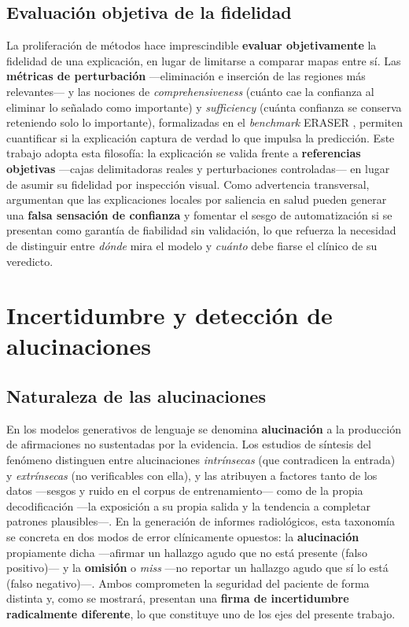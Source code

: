 \subsection{Evaluación objetiva de la fidelidad}
La proliferación de métodos hace imprescindible \textbf{evaluar objetivamente} la fidelidad de una
explicación, en lugar de limitarse a comparar mapas entre sí. Las \textbf{métricas de perturbación}
—eliminación e inserción de las regiones más relevantes— y las nociones de
\textit{comprehensiveness} (cuánto cae la confianza al eliminar lo señalado como importante) y
\textit{sufficiency} (cuánta confianza se conserva reteniendo solo lo importante), formalizadas en el
\textit{benchmark} ERASER \parencite{deyoung2020}, permiten cuantificar si la explicación captura de
verdad lo que impulsa la predicción. Este trabajo adopta esta filosofía: la explicación se valida
frente a \textbf{referencias objetivas} —cajas delimitadoras reales y perturbaciones controladas— en
lugar de asumir su fidelidad por inspección visual. Como advertencia transversal, \textcite{ghassemi2021}
argumentan que las explicaciones locales por saliencia en salud pueden generar una
\textbf{falsa sensación de confianza} y fomentar el sesgo de automatización si se presentan como
garantía de fiabilidad sin validación, lo que refuerza la necesidad de distinguir entre \emph{dónde}
mira el modelo y \emph{cuánto} debe fiarse el clínico de su veredicto.

\section{Incertidumbre y detección de alucinaciones}

\subsection{Naturaleza de las alucinaciones}
En los modelos generativos de lenguaje se denomina \textbf{alucinación} a la producción de
afirmaciones no sustentadas por la evidencia. Los estudios de síntesis del fenómeno
\parencite{ji2023} distinguen entre alucinaciones \emph{intrínsecas} (que contradicen la entrada) y
\emph{extrínsecas} (no verificables con ella), y las atribuyen a factores tanto de los datos —sesgos y
ruido en el corpus de entrenamiento— como de la propia decodificación —la exposición a su propia
salida y la tendencia a completar patrones plausibles—. En
la generación de informes radiológicos, esta taxonomía se concreta en dos modos de error
clínicamente opuestos: la \textbf{alucinación} propiamente dicha —afirmar un hallazgo agudo que no
está presente (falso positivo)— y la \textbf{omisión} o \textit{miss} —no reportar un hallazgo agudo
que sí lo está (falso negativo)—. Ambos comprometen la seguridad del paciente de forma distinta y,
como se mostrará, presentan una \textbf{firma de incertidumbre radicalmente diferente}, lo que
constituye uno de los ejes del presente trabajo.

